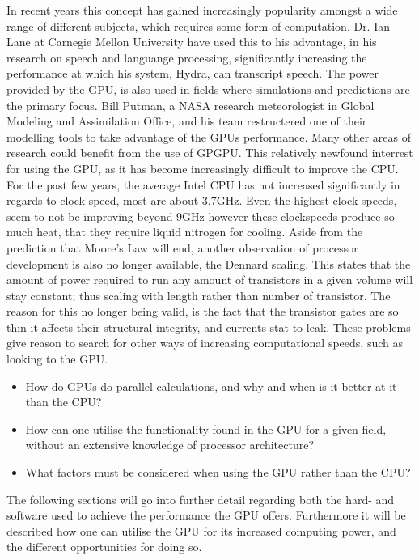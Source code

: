 In recent years this concept has gained increasingly popularity amongst a wide range of different subjects, which requires some form of computation.
Dr. Ian Lane at Carnegie Mellon University have used this to his advantage, in his research on speech and languange processing, significantly increasing the performance at which his system, Hydra, can transcript speech. %
The power provided by the GPU, is also used in fields where simulations and predictions are the primary focus. 
Bill Putman, a NASA research meteorologist in Global Modeling and Assimilation Office, and his team restructered one of their modelling tools to take advantage of the GPUs performance. %
Many other areas of research could benefit from the use of GPGPU.
This relatively newfound interrest for using the GPU, as it has become increasingly difficult to improve the CPU.
For the past few years, the average Intel CPU has not increased significantly in regards to clock speed, most are about 3.7GHz.
Even the highest clock speeds, seem to not be improving beyond 9GHz however these clockspeeds produce so much heat, that they require liquid nitrogen for cooling.
Aside from the prediction that Moore's Law will end, another observation of processor development is also no longer available, the Dennard scaling.%
This states that the amount of power required to run any amount of transistors in a given volume will stay constant; thus scaling with length rather than number of transistor.
The reason for this no longer being valid, is the fact that the transistor gates are so thin it affects their structural integrity, and currents stat to leak.%
These problems give reason to search for other ways of increasing computational speeds, such as looking to the GPU.


\begin{itemize}
	\item How do GPUs do parallel calculations, and why and when is it better at it than the CPU?
	\item How can one utilise the functionality found in the GPU for a given field, without an extensive knowledge of processor architecture?
	\item What factors must be considered when using the GPU rather than the CPU? 
\end{itemize}

The following sections will go into further detail regarding both the hard- and software used to achieve the performance the GPU offers.
Furthermore it will be described how one can utilise the GPU for its increased computing power, and the different opportunities for doing so. 

\newpage
